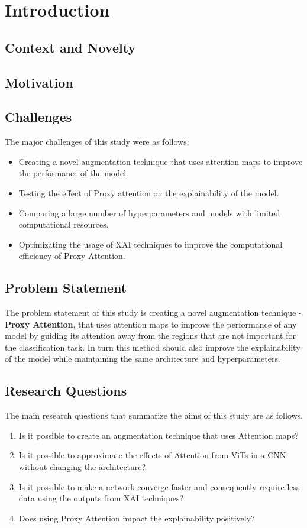 
\chapter{Introduction}
\section{Context and Novelty}

\section{Motivation}

\section{Challenges}
The major challenges of this study were as follows:
\begin{itemize}
    \item Creating a novel augmentation technique that uses attention maps to improve the performance of the model.
    \item Testing the effect of Proxy attention on the explainability of the model.
    \item Comparing a large number of hyperparameters and models with limited computational resources.
    \item Optimizating the usage of XAI techniques to improve the computational efficiency of Proxy Attention.
\end{itemize}

\section{Problem Statement}
The problem statement of this study is creating a novel augmentation technique - \textbf{Proxy Attention}, that uses attention maps to improve the performance of any model by guiding its attention away from the regions that are not important for the classification task. 
In turn this method should also improve the explainability of the model while maintaining the same architecture and hyperparameters.

\section{Research Questions} \label{section:researchq}
The main research questions that summarize the aims of this study are as follows.
\begin{enumerate}
    \item Is it possible to create an augmentation technique that uses Attention maps?
    \item Is it possible to approximate the effects of Attention from ViTs in a CNN without changing the architecture?
    \item Is it possible to make a network converge faster and consequently require less data using the outputs from XAI techniques?
    \item Does using Proxy Attention impact the explainability positively?
\end{enumerate}
